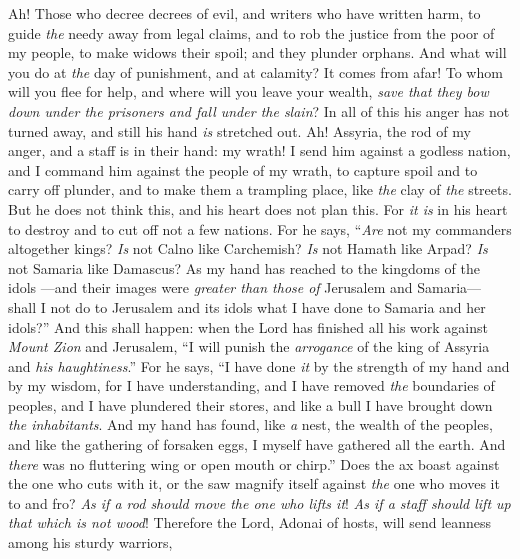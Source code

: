 \begin{biblechapter} %
 Ah! Those who decree decrees of evil, 
and writers who have written harm,
\verse to guide \textit{the} needy away from legal claims, 
and to rob the justice from the poor of my people, 
to make widows their spoil; 
and they plunder orphans.
\verse And what will you do at \textit{the} day of punishment, 
and at calamity? It comes from afar! 
To whom will you flee for help, 
and where will you leave your wealth,
\verse \textit{save that they bow down under the prisoners 
and fall under the slain}? 
In all of this his anger has not turned away, 
and still his hand \textit{is} stretched out.
 Ah! Assyria, the rod of my anger, 
and a staff is in their hand: my wrath!
\verse I send him against a godless nation, 
and I command him against the people of my wrath, 
to capture spoil 
and to carry off plunder, 
and to make them a trampling place, 
like \textit{the} clay of \textit{the} streets.
\verse But he does not think this, 
and his heart does not plan this. 
For \textit{it is} in his heart to destroy 
and to cut off not a few nations.
\verse For he says, “\textit{Are} not my commanders altogether kings?
\verse \textit{Is} not Calno like Carchemish? 
\textit{Is} not Hamath like Arpad? 
\textit{Is} not Samaria like Damascus?
\verse As my hand has reached to the kingdoms of the idols 
—and their images were \textit{greater than those of} Jerusalem and Samaria—
\verse shall I not do to Jerusalem and its idols 
what I have done to Samaria and her idols?”
\verse And this shall happen: when the Lord has finished all his work against \textit{Mount Zion} and Jerusalem, “I will punish the \textit{arrogance} of the king of Assyria and \textit{his haughtiness}.”
\verse For he says,
\verse “I have done \textit{it} by the strength of my hand 
and by my wisdom, for I have understanding, 
and I have removed \textit{the} boundaries of peoples, 
and I have plundered their stores, 
and like a bull I have brought down \textit{the inhabitants}.
\verse And my hand has found, like \textit{a} nest, the wealth of the peoples, 
and like the gathering of forsaken eggs, I myself have gathered all the earth. 
And \textit{there} was no fluttering wing or open mouth or chirp.”
\verse Does the ax boast against the one who cuts with it, 
or the saw magnify itself against \textit{the} one who moves it to and fro? 
\textit{As if a rod should move the one who lifts it}! 
\textit{As if a staff should lift up that which is not wood}!
\verse Therefore the Lord, Adonai of hosts, will send leanness among his sturdy warriors, 

\end{biblechapter}
